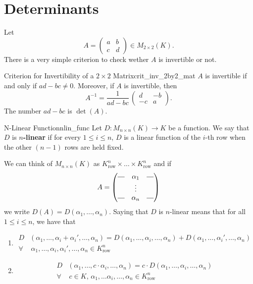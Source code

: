 % 
%
%
%

\section{Determinants}
Let 
\[
	A = \begin{pmatrix}
		a & b\\
		c & d
	\end{pmatrix} \in M_{2 \times 2}(K).
\]
There is a very simple criterion to check wether $A$ is invertible or not.

\begin{proposition}{Criterion for Invertibility of a $2 \times 2$ Matrix}{crit_inv_2by2_mat}
	$A$ is invertible if and only if $ad - bc \neq 0$. Moreover, if $A$ is invertible, then
	\[
		A^{-1} = \frac{1}{ad - bc}\, \begin{pmatrix}
			d & -b\\
			-c & a
		\end{pmatrix}.
	\]
	The number $ad - bc$ is $\det(A)$.
\end{proposition}

\begin{definition}{N-Linear Function}{nlin_func}
	Let $D:M_{n\times n}(K) \to K$ be a function. We say that $D$ is \textbf{$n$-linear} if for every $1 \leq i \leq n$, $D$ is a linear function of the $i$-th row when the other $(n-1)$ rows are held fixed.
\end{definition}
We can think of $M_{n\times n }(K)$ as $K_{\text{row}}^n \times \hdots \times K_{\text{row}}^n$ and if
\[
	A = \begin{pmatrix}
		\rule[0.5ex]{1em}{0.4pt} & \alpha_1 & \rule[0.5ex]{1em}{0.4pt}\\
		& \vdots & \\
		\rule[0.5ex]{1em}{0.4pt} & \alpha_n & \rule[0.5ex]{1em}{0.4pt}
	\end{pmatrix}
\]
we write $D(A) = D(\alpha_1, \hdots , \alpha_n)$. Saying that $D$ is $n$-linear means that for all $1 \leq i \leq n$, we have that
\begin{enumerate}
	\item \begin{align*}
		D&(\alpha_1, \hdots , \alpha_i + \alpha_i', \hdots , \alpha_n) = D(\alpha_1, \hdots , \alpha_i, \hdots , \alpha_n) + D(\alpha_1, \hdots , \alpha_i', \hdots , \alpha_n) \\
		\forall& \, \alpha_1, \hdots , \alpha_i, \alpha_i', \hdots , \alpha_n \in K^n_{\text{row}}
	\end{align*}
	\item \begin{align*}
		D&(\alpha_1, \hdots , c \cdot \alpha_i, \hdots, \alpha_n) = c \cdot D(\alpha_1, \hdots , \alpha_i, \hdots, \alpha_n) \\
		\forall& \,c \in K, \,\alpha_1, \hdots \alpha_i, \hdots , \alpha_n \in K^n_{\text{row}}
	\end{align*}
\end{enumerate}

